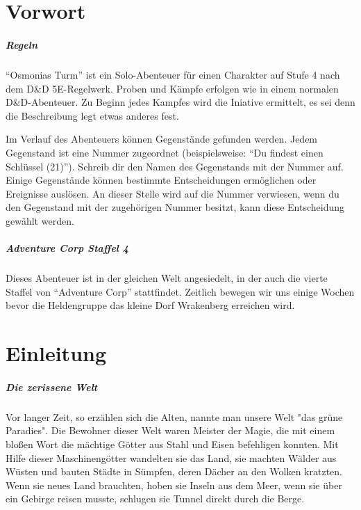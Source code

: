 
\chapter{Vorwort}

\paragraph{Regeln}

``Osmonias Turm'' ist ein Solo-Abenteuer für einen Charakter auf Stufe 4 nach dem D\&D 5E-Regelwerk. Proben und Kämpfe erfolgen wie in einem normalen D\&D-Abenteuer. Zu Beginn jedes Kampfes wird die Iniative ermittelt, es sei denn die Beschreibung legt etwas anderes fest.

Im Verlauf des Abenteuers können Gegenstände gefunden werden. Jedem Gegenstand ist eine Nummer zugeordnet (beispielsweise: ``Du findest einen Schlüssel (21)''). Schreib dir den Namen des Gegenstands mit der Nummer auf. Einige Gegenstände können bestimmte Entscheidungen ermöglichen oder Ereignisse auslösen. An dieser Stelle wird auf die Nummer verwiesen, wenn du den Gegenstand mit der zugehörigen Nummer besitzt, kann diese Entscheidung gewählt werden.

\paragraph{Adventure Corp Staffel 4}

Dieses Abenteuer ist in der gleichen Welt angesiedelt, in der auch die vierte Staffel von ``Adventure Corp'' stattfindet. Zeitlich bewegen wir uns einige Wochen bevor die Heldengruppe das kleine Dorf Wrakenberg erreichen wird.

\chapter{Einleitung}

\paragraph{Die zerissene Welt}

Vor langer Zeit, so erzählen sich die Alten, nannte man unsere Welt "das grüne Paradies". Die Bewohner dieser Welt waren Meister der Magie, die mit einem bloßen Wort die mächtige Götter aus Stahl und Eisen befehligen konnten. Mit Hilfe dieser Maschinengötter wandelten sie das Land, sie machten Wälder aus Wüsten und bauten Städte in Sümpfen, deren Dächer an den Wolken kratzten. Wenn sie neues Land brauchten, hoben sie Inseln aus dem Meer, wenn sie über ein Gebirge reisen musste, schlugen sie Tunnel direkt durch die Berge.

